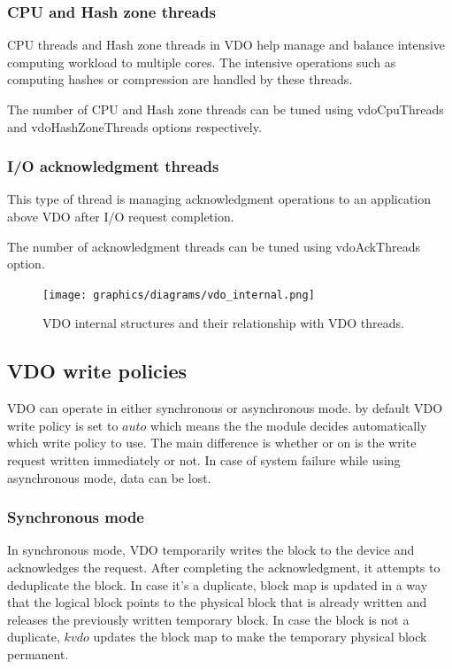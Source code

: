 \documentclass[
  color, %
  table, %
  lof,   %
  lot,   %
]{fithesis3}
\begin{document}
\subsubsection{CPU and Hash zone threads}
CPU threads and Hash zone threads in VDO help manage and balance intensive computing workload to multiple cores. The intensive operations such as computing hashes or compression are handled by these threads.

The number of CPU and Hash zone threads can be tuned using vdoCpuThreads and vdoHashZoneThreads options respectively.

\subsubsection{I/O acknowledgment threads}
This type of thread is managing acknowledgment operations to an application above VDO after I/O request completion.

The number of acknowledgment threads can be tuned using vdoAckThreads option.




\addtolength{\textheight}{1.75in}
\begin{landscape}
\begin{figure}[!hb]
        \centering
        \texttt{[image: graphics/diagrams/vdo\_internal.png]}
\caption[VDO threads and internal structures]{VDO internal structures and their relationship with VDO threads.}
\label{fig:VDO-internals}
\end{figure}
\end{landscape}
\addtolength{\textheight}{-1.75in}



\subsection{VDO write policies}
VDO can operate in either synchronous or asynchronous mode.\cite{man:writemodes} by default VDO write policy is set to $auto$ which means the the module decides automatically which write policy to use. The main difference is whether or on is the write request written immediately or not. In case of system failure while using asynchronous mode, data can be lost.

\subsubsection{Synchronous mode}
In synchronous mode, VDO temporarily writes the block to the device and acknowledges the request. After completing the acknowledgment, it attempts to deduplicate the block. In case it's a duplicate, block map is updated in a way that the logical block points to the physical block that is already written and releases the previously written temporary block. In case the block is not a duplicate, $kvdo$ updates the block map to make the temporary physical block permanent.
\end{document}
